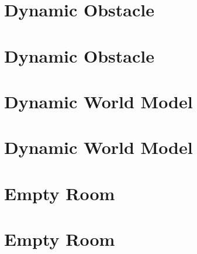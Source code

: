\let\mypdfximage\pdfximage\def\pdfximage{\immediate\mypdfximage}\documentclass[twoside]{book}
\newcommand{\+}{\discretionary{\mbox{\scriptsize$\hookleftarrow$}}{}{}}
\begin{document}
\chapter{Dynamic Obstacle}
\label{md_smacc2_sm_reference_library_sm_dance_bot_warehouse_2_models_dynamic_obstacle_README}

\chapter{Dynamic Obstacle}
\label{md_smacc2_sm_reference_library_sm_dance_bot_warehouse_2_models_dynamic_obstacle_copy_README}

\chapter{Dynamic World Model}
\label{md_smacc2_sm_reference_library_sm_dance_bot_warehouse_2_models_dynamic_world_README}

\chapter{Dynamic World Model}
\label{md_smacc2_sm_reference_library_sm_dance_bot_warehouse_2_models_dynamic_world_copy_README}

\chapter{Empty Room}
\label{md_smacc2_sm_reference_library_sm_dance_bot_warehouse_2_models_empty_room_README}

\chapter{Empty Room}
\label{md_smacc2_sm_reference_library_sm_dance_bot_warehouse_2_models_empty_room_copy_README}

\end{document}
